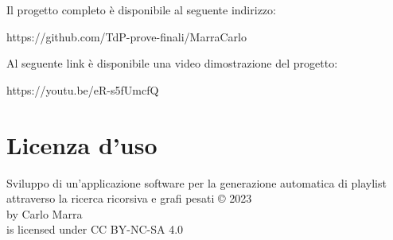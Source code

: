 \documentclass[12pt, a4paper]{article}
\begin{document}
Il progetto completo è disponibile al seguente indirizzo: 

https://github.com/TdP-prove-finali/MarraCarlo

Al seguente link è disponibile una video dimostrazione del progetto:

https://youtu.be/eR-s5fUmcfQ



\newpage
\section*{Licenza d'uso}
\begin{center}
 Sviluppo di un'applicazione software per la generazione automatica di playlist attraverso la ricerca ricorsiva e grafi pesati  © 2023\\ by Carlo Marra\\ is licensed under CC BY-NC-SA 4.0
\end{center}
\end{document}
